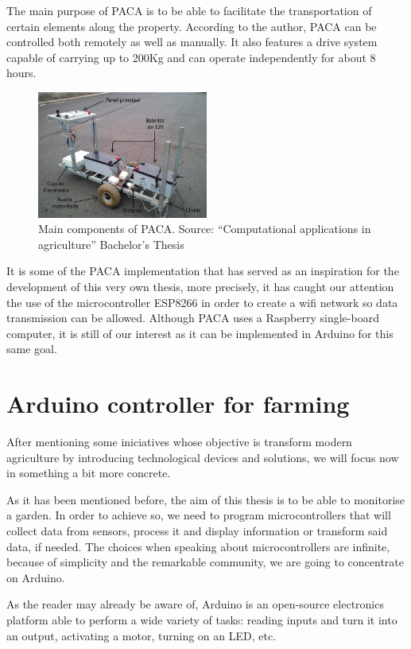 The main purpose of PACA is to be able to facilitate the transportation of certain elements along the property. According to the author, PACA can be controlled both remotely as well as manually. It also features a drive system capable of carrying up to 200Kg and can operate independently for about 8 hours.

\begin{figure}[htp]
    \centering
    \includegraphics[width=0.5\textwidth]{fig/paca.png}
    \caption{Main components of PACA. Source: ``Computational applications in agriculture'' Bachelor's Thesis}
    \label{fig:paca}
\end{figure}

 It is some of the PACA implementation that has served as an inspiration for the development of this very own thesis, more precisely, it has caught our attention the use of the microcontroller ESP8266 in order to create a wifi network so data transmission can be allowed. Although PACA uses a Raspberry single-board computer, it is still of our interest as it can be implemented in Arduino for this same goal.

\section{Arduino controller for farming}
After mentioning some iniciatives whose objective is transform modern agriculture by introducing technological devices and solutions, we will focus now in something a bit more concrete.

As it has been mentioned before, the aim of this thesis is to be able to monitorise a garden. In order to achieve so, we need to program microcontrollers that will collect data from sensors, process it and display information or transform said data, if needed. The choices when speaking about microcontrollers are infinite, because of simplicity and the remarkable community, we are going to concentrate on Arduino.

As the reader may already be aware of, Arduino is an open-source electronics platform able to perform a wide variety of tasks: reading inputs and turn it into an output, activating a motor, turning on an LED\cite{arduino}, etc.


